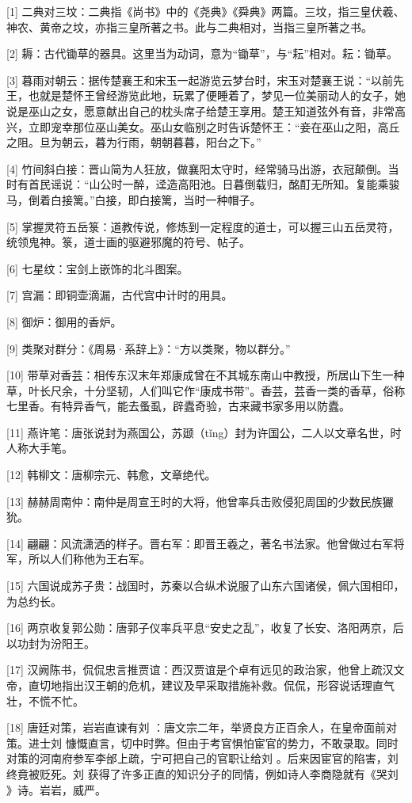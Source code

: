 \documentclass[12pt,UTF8]{ctexbook}
\begin{document}
[1] 二典对三坟：二典指《尚书》中的《尧典》《舜典》两篇。三坟，指三皇伏羲、神农、黄帝之坟，亦指三皇所著之书。此与二典相对，当指三皇所著之书。

[2] 耨：古代锄草的器具。这里当为动词，意为“锄草”，与“耘”相对。耘：锄草。

[3] 暮雨对朝云：据传楚襄王和宋玉一起游览云梦台时，宋玉对楚襄王说：“以前先王，也就是楚怀王曾经游览此地，玩累了便睡着了，梦见一位美丽动人的女子，她说是巫山之女，愿意献出自己的枕头席子给楚王享用。楚王知道弦外有音，非常高兴，立即宠幸那位巫山美女。巫山女临别之时告诉楚怀王：“妾在巫山之阳，高丘之阻。旦为朝云，暮为行雨，朝朝暮暮，阳台之下。”

[4] 竹间斜白接：晋山简为人狂放，做襄阳太守时，经常骑马出游，衣冠颠倒。当时有首民谣说：“山公时一醉，迳造高阳池。日暮倒载归，酩酊无所知。复能乘骏马，倒着白接篱。”白接，即白接篱，当时一种帽子。

[5] 掌握灵符五岳箓：道教传说，修炼到一定程度的道士，可以握三山五岳灵符，统领鬼神。箓，道士画的驱避邪魔的符号、帖子。

[6] 七星纹：宝剑上嵌饰的北斗图案。

[7] 宫漏：即铜壶滴漏，古代宫中计时的用具。

[8] 御炉：御用的香炉。

[9] 类聚对群分：《周易·系辞上》：“方以类聚，物以群分。”

[10] 带草对香芸：相传东汉末年郑康成曾在不其城东南山中教授，所居山下生一种草，叶长尺余，十分坚韧，人们叫它作“康成书带”。香芸，芸香一类的香草，俗称七里香。有特异香气，能去蚤虱，辟蠹奇验，古来藏书家多用以防蠹。

[11] 燕许笔：唐张说封为燕国公，苏颋（tǐng）封为许国公，二人以文章名世，时人称大手笔。

[12] 韩柳文：唐柳宗元、韩愈，文章绝代。

[13] 赫赫周南仲：南仲是周宣王时的大将，他曾率兵击败侵犯周国的少数民族玁狁。

[14] 翩翩：风流潇洒的样子。晋右军：即晋王羲之，著名书法家。他曾做过右军将军，所以人们称他为王右军。

[15] 六国说成苏子贵：战国时，苏秦以合纵术说服了山东六国诸侯，佩六国相印，为总约长。

[16] 两京收复郭公勋：唐郭子仪率兵平息“安史之乱”，收复了长安、洛阳两京，后以功封为汾阳王。

[17] 汉阙陈书，侃侃忠言推贾谊：西汉贾谊是个卓有远见的政治家，他曾上疏汉文帝，直切地指出汉王朝的危机，建议及早采取措施补救。侃侃，形容说话理直气壮，不慌不忙。

[18] 唐廷对策，岩岩直谏有刘 ：唐文宗二年，举贤良方正百余人，在皇帝面前对策。进士刘 慷慨直言，切中时弊。但由于考官惧怕宦官的势力，不敢录取。同时对策的河南府参军李邰上疏，宁可把自己的官职让给刘 。后来因宦官的陷害，刘 终竟被贬死。刘 获得了许多正直的知识分子的同情，例如诗人李商隐就有《哭刘 》诗。岩岩，威严。
\end{document}
